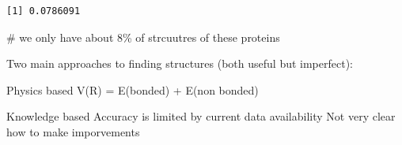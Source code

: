 \documentclass[
  letterpaper,
  DIV=11,
  numbers=noendperiod]{scrartcl}
\newenvironment{Shaded}{\begin{snugshade}}{\end{snugshade}}
\newcommand{\CommentTok}[1]{\textcolor[rgb]{0.37,0.37,0.37}{#1}}
\begin{document}
\begin{verbatim}
[1] 0.0786091
\end{verbatim}

\begin{Shaded}
\begin{Highlighting}[]
\CommentTok{\# we only have about 8\% of strcuutres of these proteins }
\end{Highlighting}
\end{Shaded}

Two main approaches to finding structures (both useful but imperfect):

Physics based V(R) = E(bonded) + E(non bonded)

Knowledge based Accuracy is limited by current data availability Not
very clear how to make imporvements
\end{document}
